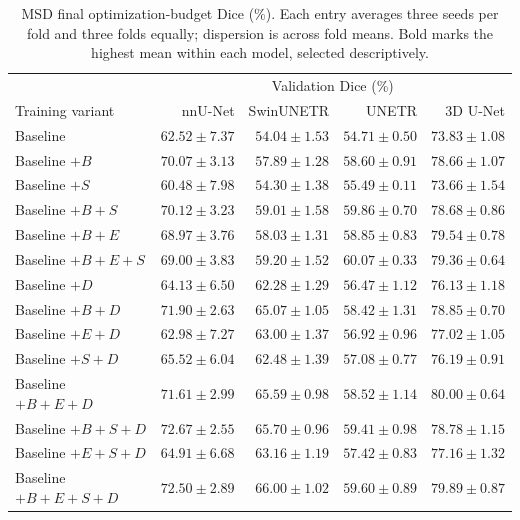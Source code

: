 \documentclass[12pt,a4paper]{article}
\begin{document}
\begin{table}[htbp]
\centering\small{}
\setlength{\tabcolsep}{5pt}
\renewcommand{\arraystretch}{1.15}
\begin{tabular}{@{}lrrrr@{}}
\hline
 & \multicolumn{4}{c}{Validation Dice (\%)} \\
Training variant & nnU-Net & SwinUNETR & UNETR & 3D U-Net \\
\hline
Baseline & $62.52\pm7.37$ & $54.04\pm1.53$ & $54.71\pm0.50$ & $73.83\pm1.08$ \\
Baseline $+B$ & $70.07\pm3.13$ & $57.89\pm1.28$ & $58.60\pm0.91$ & $78.66\pm1.07$ \\
Baseline $+S$ & $60.48\pm7.98$ & $54.30\pm1.38$ & $55.49\pm0.11$ & $73.66\pm1.54$ \\
Baseline $+B+S$ & $70.12\pm3.23$ & $59.01\pm1.58$ & $59.86\pm0.70$ & $78.68\pm0.86$ \\
Baseline $+B+E$ & $68.97\pm3.76$ & $58.03\pm1.31$ & $58.85\pm0.83$ & $79.54\pm0.78$ \\
Baseline $+B+E+S$ & $69.00\pm3.83$ & $59.20\pm1.52$ & $\mathbf{60.07\pm0.33}$ & $79.36\pm0.64$ \\
Baseline $+D$ & $64.13\pm6.50$ & $62.28\pm1.29$ & $56.47\pm1.12$ & $76.13\pm1.18$ \\
Baseline $+B+D$ & $71.90\pm2.63$ & $65.07\pm1.05$ & $58.42\pm1.31$ & $78.85\pm0.70$ \\
Baseline $+E+D$ & $62.98\pm7.27$ & $63.00\pm1.37$ & $56.92\pm0.96$ & $77.02\pm1.05$ \\
Baseline $+S+D$ & $65.52\pm6.04$ & $62.48\pm1.39$ & $57.08\pm0.77$ & $76.19\pm0.91$ \\
Baseline $+B+E+D$ & $71.61\pm2.99$ & $65.59\pm0.98$ & $58.52\pm1.14$ & $\mathbf{80.00\pm0.64}$ \\
Baseline $+B+S+D$ & $\mathbf{72.67\pm2.55}$ & $65.70\pm0.96$ & $59.41\pm0.98$ & $78.78\pm1.15$ \\
Baseline $+E+S+D$ & $64.91\pm6.68$ & $63.16\pm1.19$ & $57.42\pm0.83$ & $77.16\pm1.32$ \\
Baseline $+B+E+S+D$ & $72.50\pm2.89$ & $\mathbf{66.00\pm1.02}$ & $59.60\pm0.89$ & $79.89\pm0.87$ \\
\hline
\end{tabular}
\caption{MSD final optimization-budget Dice (\%). Each entry averages three seeds per fold and three folds equally; dispersion is across fold means. Bold marks the highest mean within each model, selected descriptively.}
\label{tab:msd-noaug-matrix}
\end{table}
\end{document}
